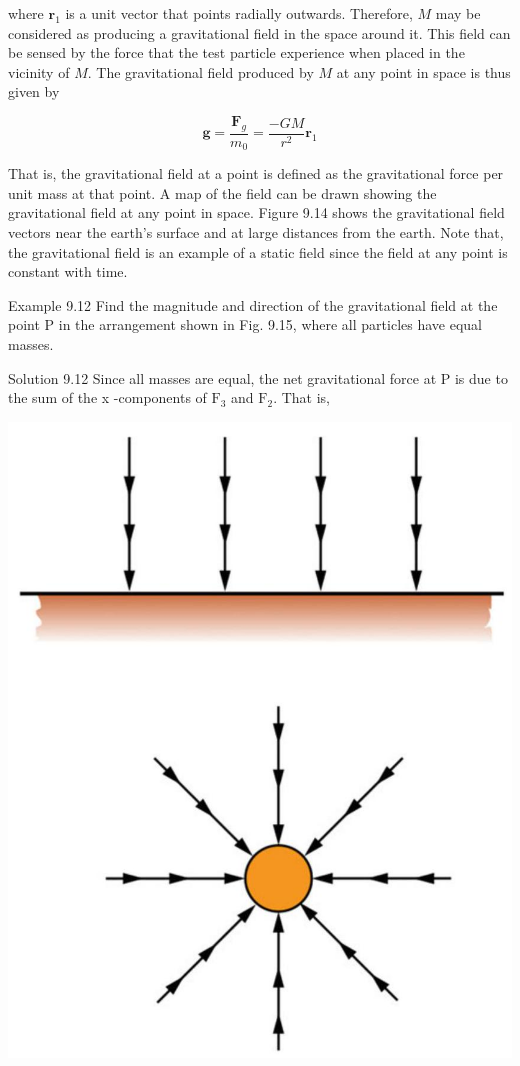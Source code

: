 \documentclass[10pt]{article}
\begin{document}
where $\mathbf{r}_{1}$ is a unit vector that points radially outwards. Therefore, $M$ may be considered as producing a gravitational field in the space around it. This field can be sensed by the force that the test particle experience when placed in the vicinity of $M$. The gravitational field produced by $M$ at any point in space is thus given by

$$
\mathbf{g}=\frac{\mathbf{F}_{g}}{m_{0}}=\frac{-G M}{r^{2}} \mathbf{r}_{1}
$$

That is, the gravitational field at a point is defined as the gravitational force per unit mass at that point. A map of the field can be drawn showing the gravitational field at any point in space. Figure 9.14 shows the gravitational field vectors near the earth's surface and at large distances from the earth. Note that, the gravitational field is an example of a static field since the field at any point is constant with time.

Example 9.12 Find the magnitude and direction of the gravitational field at the point P in the arrangement shown in Fig. 9.15, where all particles have equal masses.

Solution 9.12 Since all masses are equal, the net gravitational force at P is due to the sum of the x -components of $\mathrm{F}_{3}$ and $\mathrm{F}_{2}$. That is,

\begin{center}
\includegraphics[max width=\textwidth]{2024_09_13_db1f357d2aad0a03eb2eg-152(2)}
\end{center}
\end{document}

